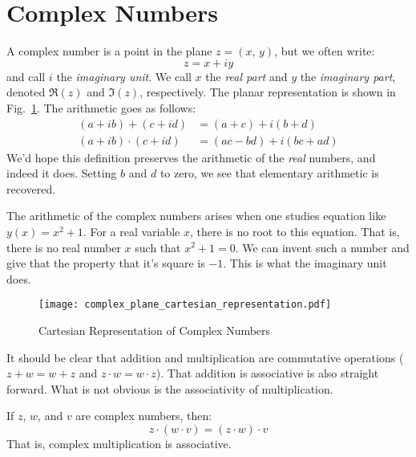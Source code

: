 \section{Complex Numbers}
    A \gls{complex number} is a point in the plane $z=(x,\,y)$,
    but we often write:
    \begin{equation}
        z=x+iy
    \end{equation}
    and call $i$ the \textit{imaginary unit}. We call $x$ the
    \textit{real part} and $y$ the \textit{imaginary part}, denoted
    $\Re(z)$ and $\Im(z)$, respectively. The planar representation
    is shown in Fig.~\ref{fig:Cart_Rep_of_Comp_Num}.
    The arithmetic goes as follows:
    \begin{subequations}
        \begin{align}
            \label{eqn:Complex_Addition}%
            (a+ib)+(c+id)&=(a+c)+i(b+d)\\
            \label{eqn:Complex_Multiplication}%
            (a+ib)\cdot(c+id)&=(ac-bd)+i(bc+ad)
        \end{align}
    \end{subequations}
    We'd hope this definition preserves the arithmetic of the
    \textit{real} numbers, and indeed it does. Setting $b$ and $d$
    to zero, we see that elementary arithmetic is recovered.
    \par\hfill\par
    The arithmetic of the complex numbers arises when one studies equation
    like $y(x)=x^{2}+1$. For a real variable $x$, there is no root to this
    equation. That is, there is no real number $x$ such that $x^{2}+1=0$.
    We can invent such a number and give that the property that it's square
    is $\minus{1}$. This is what the imaginary unit does.
    \begin{figure}[H]
        \centering
        \captionsetup{type=figure}
        \texttt{[image: complex\_plane\_cartesian\_representation.pdf]}
        \caption{Cartesian Representation of Complex Numbers}
        \label{fig:Cart_Rep_of_Comp_Num}
    \end{figure}
    It should be clear  that addition and multiplication are commutative
    operations ($z+w=w+z$ and $z\cdot{w}=w\cdot{z}$). That addition
    is associative is also straight forward. What is not
    obvious is the associativity of multiplication.
    \begin{theorem}
        \label{thm:Complex_Multiplication_Associative}%
        If $z$, $w$, and $v$ are complex numbers, then:
        \begin{equation}
            z\cdot(w\cdot{v})=(z\cdot{w})\cdot{v}
        \end{equation}
        That is, complex multiplication is associative.
    \end{theorem}

